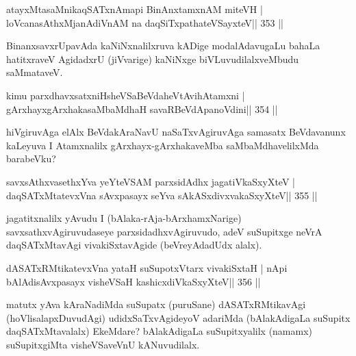 
\begin{shl}
atayxMtasaMnikaqSATxnAmapi BinAnxtamxnAM miteVH |
loVcanasAthxMjanAdiVnAM na daqSiTxpathateVSayxteV\hfill || 353 ||
\end{shl}

\begin{artha}
BinanxsavxrUpavAda kaNiNxnalilxruva kADige modalAdavugaLu bahaLa  hatitxraveV AgidadxrU (jiVvarige) kaNiNxge biVLuvudilalxveMbudu saMmataveV.
\end{artha}

\begin{shl}
kimu parxdhavxsatxniHsheVSaBeVdaheVtAvihA\s\s tamxni |
gArxhayxgArxhakasaMbaMdhaH savaRBeVdApanoVdini\hfill || 354 ||
\end{shl}

\begin{artha}
hiVgiruvAga elAlx BeVdakAraNavU naSaTxvAgiruvAga samasatx BeVdavanunx kaLeyuva I Atamxnalilx gArxhayx-gArxhakaveMba saMbaMdhavelilxMda barabeVku?
\end{artha}


\begin{shl}
savxsAthxvasethxYva yeYteVSAM parxsidAdhx jagatiVkaSxyXteV |
daqSATxMtatevxVna sAvxpasayx seYva sAkASxdivxvakaSxyXteV\hfill || 355 ||
\end{shl}

\begin{artha}
jagatitxnalilx yAvudu I (bAlaka-rAja-bArxhamxNarige)  savxsathxvAgiruvudaseye parxsidadhxvAgiruvudo, adeV suSupitxge neVrA  daqSATxMtavAgi vivakiSxtavAgide (beVreyAdadUdx alalx).
\end{artha}

\begin{shl}
dASATxRMtikatevxVna yataH suSupotxV\s tarx vivakiSxtaH |
nApi bAlAdisAvxpasayx visheVSaH kashicxdiVkaSxyXteV\hfill || 356 ||
\end{shl}

\begin{artha}
matutx yAva kAraNadiMda suSupatx (puruSane) dASATxRMtikavAgi (hoVli\-salapxDuvudAgi) udidxSaTxvAgideyoV adariMda (bAlakAdigaLa suSupitx daqSATxMta\-valalx) EkeMdare? bAlakAdigaLa suSupitxyalilx (namamx) suSupitxgiMta visheVSaveVnU kANuvudilalx.
\end{artha}

